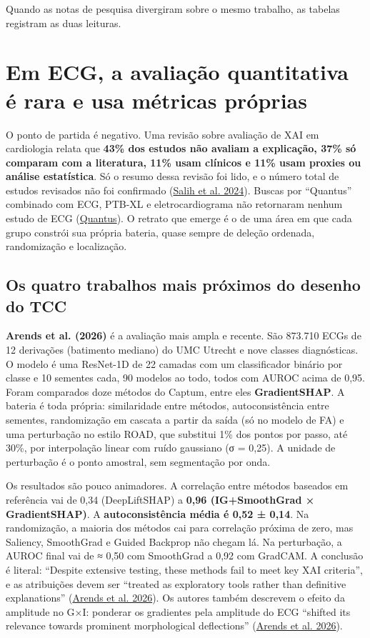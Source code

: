 \documentclass[11pt,a4paper]{article}
\begin{document}
Quando as notas de pesquisa divergiram sobre o mesmo trabalho, as tabelas registram as duas leituras.



\section{Em ECG, a avaliação quantitativa é rara e usa métricas próprias}

O ponto de partida é negativo. Uma revisão sobre avaliação de XAI em cardiologia relata que \textbf{43\% dos estudos não avaliam a explicação, 37\% só comparam com a literatura, 11\% usam clínicos e 11\% usam proxies ou análise estatística}. Só o resumo dessa revisão foi lido, e o número total de estudos revisados não foi confirmado (\href{https://pmc.ncbi.nlm.nih.gov/articles/pmid/39132011}{Salih et al. 2024}). Buscas por ``Quantus'' combinado com ECG, PTB-XL e eletrocardiograma não retornaram nenhum estudo de ECG (\href{https://github.com/understandable-machine-intelligence-lab/Quantus}{Quantus}). O retrato que emerge é o de uma área em que cada grupo constrói sua própria bateria, quase sempre de deleção ordenada, randomização e localização.

\subsection{Os quatro trabalhos mais próximos do desenho do TCC}

\textbf{Arends et al. (2026)} é a avaliação mais ampla e recente. São 873.710 ECGs de 12 derivações (batimento mediano) do UMC Utrecht e nove classes diagnósticas. O modelo é uma ResNet-1D de 22 camadas com um classificador binário por classe e 10 sementes cada, 90 modelos ao todo, todos com AUROC acima de 0,95. Foram comparados doze métodos do Captum, entre eles \textbf{GradientSHAP}. A bateria é toda própria: similaridade entre métodos, autoconsistência entre sementes, randomização em cascata a partir da saída (só no modelo de FA) e uma perturbação no estilo ROAD, que substitui 1\% dos pontos por passo, até 30\%, por interpolação linear com ruído gaussiano (σ = 0,25). A unidade de perturbação é o ponto amostral, sem segmentação por onda.

Os resultados são pouco animadores. A correlação entre métodos baseados em referência vai de 0,34 (DeepLiftSHAP) a \textbf{0,96 (IG+SmoothGrad × GradientSHAP)}. A \textbf{autoconsistência média é 0,52 ± 0,14}. Na randomização, a maioria dos métodos cai para correlação próxima de zero, mas Saliency, SmoothGrad e Guided Backprop não chegam lá. Na perturbação, a AUROC final vai de ≈ 0,50 com SmoothGrad a 0,92 com GradCAM. A conclusão é literal: ``Despite extensive testing, these methods fail to meet key XAI criteria'', e as atribuições devem ser ``treated as exploratory tools rather than definitive explanations'' (\href{https://pmc.ncbi.nlm.nih.gov/articles/PMC12980500/}{Arends et al. 2026}). Os autores também descrevem o efeito da amplitude no G×I: ponderar os gradientes pela amplitude do ECG ``shifted its relevance towards prominent morphological deflections'' (\href{https://pmc.ncbi.nlm.nih.gov/articles/PMC12980500/}{Arends et al. 2026}).
\end{document}
